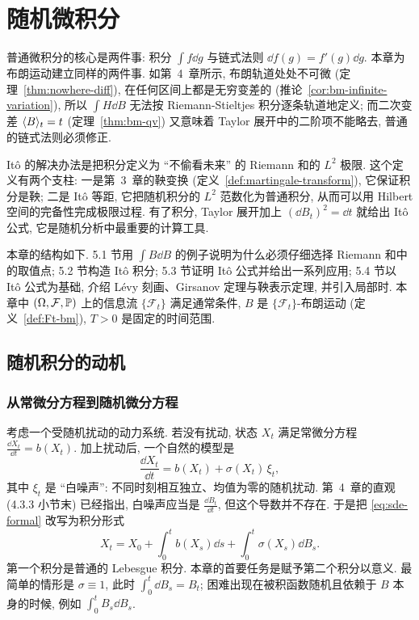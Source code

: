 \chapter{随机微积分}
\label{ch:5}

普通微积分的核心是两件事: 积分 $\int f\dd g$ 与链式法则 $\dd f(g)=f'(g)\dd g$. 本章为布朗运动建立同样的两件事. 如第~4~章所示, 布朗轨道处处不可微 (定理~\ref{thm:nowhere-diff}), 在任何区间上都是无穷变差的 (推论~\ref{cor:bm-infinite-variation}), 所以 $\int H\dd B$ 无法按 Riemann-Stieltjes 积分逐条轨道地定义; 而二次变差 $\ip{B}_t=t$ (定理~\ref{thm:bm-qv}) 又意味着 Taylor 展开中的二阶项不能略去, 普通的链式法则必须修正.

It\^o 的解决办法是把积分定义为 ``不偷看未来'' 的 Riemann 和的 $L^2$ 极限. 这个定义有两个支柱: 一是第~3~章的鞅变换 (定义~\ref{def:martingale-transform}), 它保证积分是鞅; 二是 It\^o 等距, 它把随机积分的 $L^2$ 范数化为普通积分, 从而可以用 Hilbert 空间的完备性完成极限过程. 有了积分, Taylor 展开加上 $(\dd B_t)^2=\dd t$ 就给出 It\^o 公式, 它是随机分析中最重要的计算工具.

本章的结构如下. 5.1 节用 $\int B\dd B$ 的例子说明为什么必须仔细选择 Riemann 和中的取值点; 5.2 节构造 It\^o 积分; 5.3 节证明 It\^o 公式并给出一系列应用; 5.4 节以 It\^o 公式为基础, 介绍 L\'evy 刻画、Girsanov 定理与鞅表示定理, 并引入局部时. 本章中 $(\Omega,\mathcal{F},\P)$ 上的信息流 $\{\mathcal{F}_t\}$ 满足通常条件, $B$ 是 $\{\mathcal{F}_t\}$-布朗运动 (定义~\ref{def:Ft-bm}), $T>0$ 是固定的时间范围.

\section{随机积分的动机}
\label{sec:5-1}

\subsection{从常微分方程到随机微分方程}

考虑一个受随机扰动的动力系统. 若没有扰动, 状态 $X_t$ 满足常微分方程 $\frac{\dd X_t}{\dd t}=b(X_t)$. 加上扰动后, 一个自然的模型是
\begin{equation}\label{eq:sde-formal}
\frac{\dd X_t}{\dd t}=b(X_t)+\sigma(X_t)\,\xi_t,
\end{equation}
其中 $\xi_t$ 是 ``白噪声'': 不同时刻相互独立、均值为零的随机扰动. 第~4~章的直观 (4.3.3 小节末) 已经指出, 白噪声应当是 $\frac{\dd B_t}{\dd t}$, 但这个导数并不存在. 于是把 \eqref{eq:sde-formal} 改写为积分形式
\[
X_t=X_0+\int_0^tb(X_s)\dd s+\int_0^t\sigma(X_s)\dd B_s.
\]
第一个积分是普通的 Lebesgue 积分. 本章的首要任务是赋予第二个积分以意义. 最简单的情形是 $\sigma\equiv1$, 此时 $\int_0^t\dd B_s=B_t$; 困难出现在被积函数随机且依赖于 $B$ 本身的时候, 例如 $\int_0^tB_s\dd B_s$.

